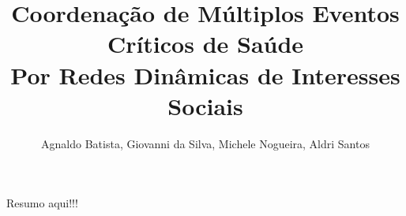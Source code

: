 \documentclass[12pt]{article}
\title{
Coordenação de 
Múltiplos Eventos Críticos de Saúde \\ 
Por 
Redes 
Dinâmicas 
de Interesses
Sociais}
\author{Agnaldo Batista\inst{1}, Giovanni da Silva\inst{1}, Michele Nogueira\inst{1}, Aldri Santos\inst{1}}
\begin{document}
 
\maketitle



\begin{resumo} 

Resumo aqui!!!


\end{resumo}
\end{document}
